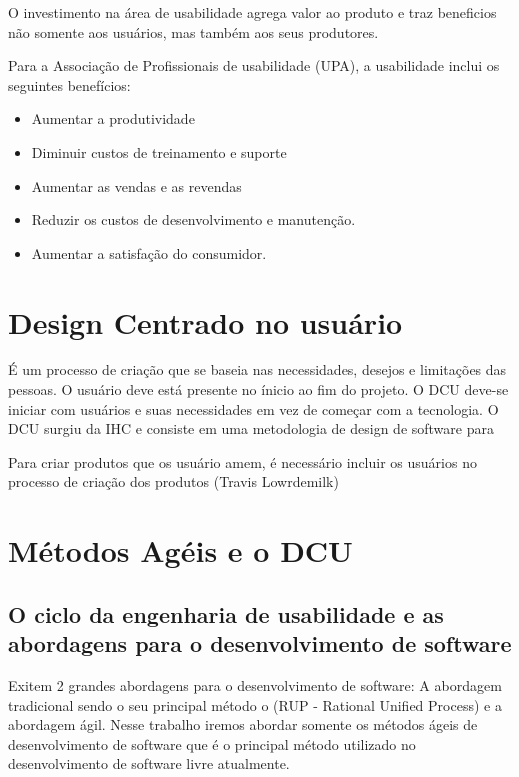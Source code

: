 	O investimento na área de usabilidade agrega valor ao produto e traz beneficios não somente aos usuários, mas também aos seus produtores. 

Para a Associação de Profissionais de usabilidade (UPA), a usabilidade inclui os seguintes benefícios:

\begin{itemize}
\item Aumentar a produtividade
\item Diminuir custos de treinamento e suporte
\item Aumentar as vendas e as revendas
\item Reduzir os custos de desenvolvimento e manutenção.
\item Aumentar a satisfação do consumidor.
\end{itemize}


\section{Design Centrado no usuário}

É um processo de criação que se baseia nas necessidades, desejos e limitações das pessoas. O usuário deve está presente no ínicio ao fim do projeto.
O DCU deve-se iniciar com usuários e suas necessidades em vez de começar com a tecnologia.
O DCU surgiu da IHC e consiste em uma metodologia de design de software para 


Para criar produtos que os usuário amem, é necessário incluir os usuários no processo de criação dos produtos (Travis Lowrdemilk)

\section{Métodos Agéis e o DCU}

\subsection{O ciclo da engenharia de usabilidade e as abordagens para o desenvolvimento de software}

	Exitem 2 grandes abordagens para o desenvolvimento de software: A abordagem tradicional sendo o seu principal método o (RUP - Rational Unified Process) e a abordagem ágil.
	Nesse trabalho iremos abordar somente os métodos ágeis de desenvolvimento de software que é o principal método utilizado no desenvolvimento de software livre atualmente.

